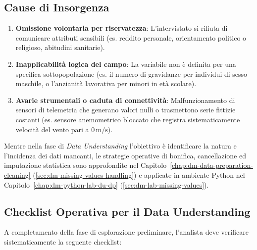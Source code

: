 \subsection{Cause di Insorgenza}
\begin{enumerate}
    \item \textbf{Omissione volontaria per riservatezza}: L'intervistato si rifiuta di comunicare attributi sensibili (es. reddito personale, orientamento politico o religioso, abitudini sanitarie).
    \item \textbf{Inapplicabilità logica del campo}: La variabile non è definita per una specifica sottopopolazione (es. il numero di gravidanze per individui di sesso maschile, o l'anzianità lavorativa per minori in età scolare).
    \item \textbf{Avarie strumentali o caduta di connettività}: Malfunzionamento di sensori di telemetria che generano valori nulli o trasmettono serie fittizie costanti (es. sensore anemometrico bloccato che registra sistematicamente velocità del vento pari a $0\,\text{m/s}$).
\end{enumerate}

Mentre nella fase di \textit{Data Understanding} l'obiettivo è identificare la natura e l'incidenza dei dati mancanti, le strategie operative di bonifica, cancellazione ed imputazione statistica sono approfondite nel Capitolo~\ref{chap:dm-data-preparation-cleaning} (\autoref{sec:dm-missing-values-handling}) e applicate in ambiente Python nel Capitolo~\ref{chap:dm-python-lab-du-dp} (\autoref{sec:dm-lab-missing-values}).

\subsection{Checklist Operativa per il Data Understanding}

A completamento della fase di esplorazione preliminare, l'analista deve verificare sistematicamente la seguente checklist:

